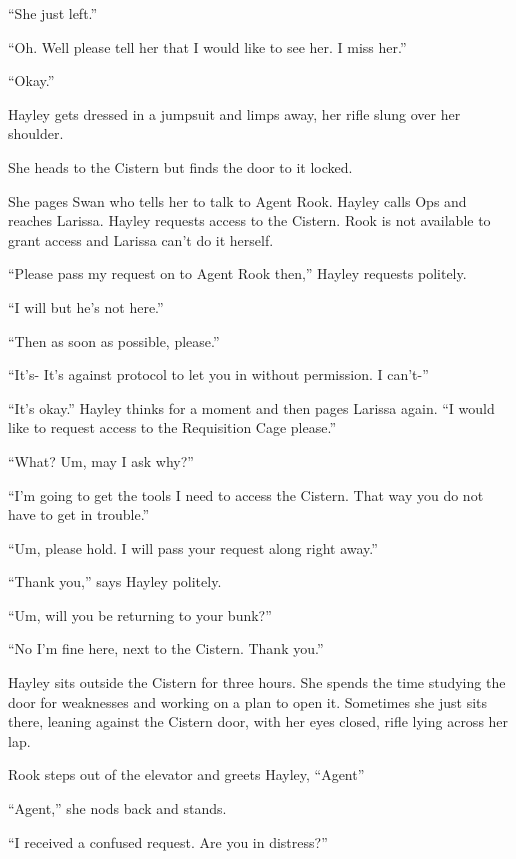 ``She just left.''

``Oh.  Well please tell her that I would like to see her.  I miss her.''

``Okay.''

Hayley gets dressed in a jumpsuit and limps away, her rifle slung over her shoulder.





She heads to the Cistern but finds the door to it locked.



She pages Swan who tells her to talk to Agent Rook.  Hayley calls Ops and reaches Larissa.  Hayley requests access to the Cistern.  Rook is not available to grant access and Larissa can't do it herself.  

``Please pass my request on to Agent Rook then,'' Hayley requests politely.

``I will but he's not here.''

``Then as soon as possible, please.''

``It's- It's against protocol to let you in without permission.  I can't-''

``It's okay.''  Hayley thinks for a moment and then pages Larissa again.  ``I would like to request access to the Requisition Cage please.''

``What?  Um, may I ask why?''

``I'm going to get the tools I need to access the Cistern.  That way you do not have to get in trouble.''

``Um, please hold.  I will pass your request along right away.''

``Thank you,'' says Hayley politely.

``Um, will you be returning to your bunk?''

``No I'm fine here, next to the Cistern.  Thank you.''



Hayley sits outside the Cistern for three hours.  She spends the time studying the door for weaknesses and working on a plan to open it.  Sometimes she just sits there, leaning against the Cistern door, with her eyes closed, rifle lying across her lap.



Rook steps out of the elevator and greets Hayley, ``Agent''

``Agent,'' she nods back and stands.

``I received a confused request.  Are you in distress?''

